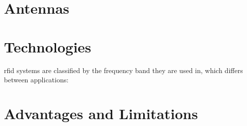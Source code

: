 







\section{Antennas}


\section{Technologies}

\ac{rfid} systems are classified by the frequency band they are used in, which differs between applications:

\section{Advantages and Limitations}



